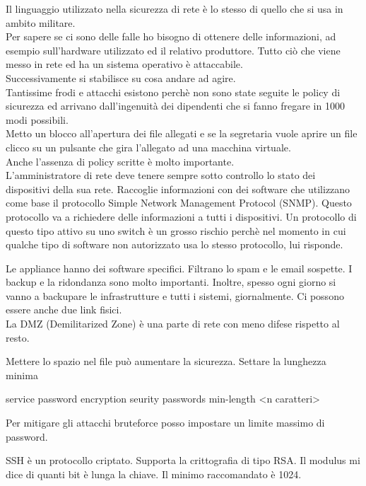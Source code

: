 \documentclass{article}
\begin{document}
    Il linguaggio utilizzato nella sicurezza di rete è lo stesso di quello che si usa in ambito militare.\\
    Per sapere se ci sono delle falle ho bisogno di ottenere delle informazioni, ad esempio sull'hardware utilizzato ed il relativo produttore. Tutto ciò che viene messo in rete ed ha un sistema operativo è attaccabile.\\
    Successivamente si stabilisce su cosa andare ad agire.\\
    Tantissime frodi e attacchi esistono perchè non sono state seguite le policy di sicurezza ed arrivano dall'ingenuità dei dipendenti che si fanno fregare in 1000 modi possibili.\\
    Metto un blocco all'apertura dei file allegati e se la segretaria vuole aprire un file clicco su un pulsante che gira l'allegato ad una macchina virtuale.\\
    Anche l'assenza di policy scritte è molto importante.\\
    L'amministratore di rete deve tenere sempre sotto controllo lo stato dei dispositivi della sua rete. Raccoglie informazioni con dei software che utilizzano come base il protocollo Simple Network Management Protocol (SNMP). Questo protocollo va a richiedere delle informazioni a tutti i dispositivi. Un protocollo di questo tipo attivo su uno switch è un grosso rischio perchè nel momento in cui qualche tipo di software non autorizzato usa lo stesso protocollo, lui risponde.

    Le appliance hanno dei software specifici. Filtrano lo spam e le email sospette.
    I backup e la ridondanza sono molto importanti. Inoltre, spesso ogni giorno si vanno a backupare le infrastrutture e tutti i sistemi, giornalmente. Ci possono essere anche due link fisici.\\

    La DMZ (Demilitarized Zone) è una parte di rete con meno difese rispetto al resto.

    Mettere lo spazio nel file può aumentare la sicurezza. Settare la lunghezza minima

    service password encryption
    seurity passwords min-length <n caratteri>

    Per mitigare gli attacchi bruteforce posso impostare un limite massimo di password.

    SSH è un protocollo criptato. Supporta la crittografia di tipo RSA. Il modulus mi dice di quanti bit è lunga la chiave. Il minimo raccomandato è 1024.
\end{document}
